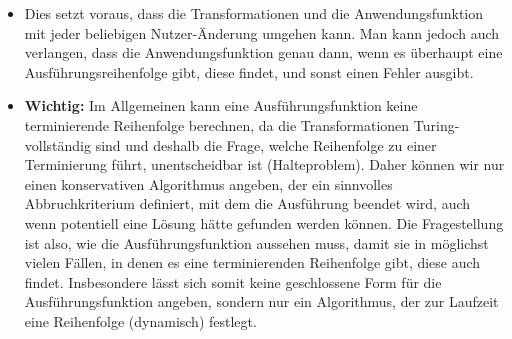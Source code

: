 \begin{itemize}
\begin{itemize}
    \end{itemize}
    \item Dies setzt voraus, dass die Transformationen und die Anwendungsfunktion mit jeder beliebigen Nutzer-Änderung umgehen kann. Man kann jedoch auch verlangen, dass die Anwendungsfunktion genau dann, wenn es überhaupt eine Ausführungsreihenfolge gibt, diese findet, und sonst einen Fehler ausgibt.
    \item \textbf{Wichtig:} Im Allgemeinen kann eine Ausführungsfunktion keine terminierende Reihenfolge berechnen, da die Transformationen Turing-vollständig sind und deshalb die Frage, welche Reihenfolge zu einer Terminierung führt, unentscheidbar ist (Halteproblem). Daher können wir nur einen konservativen Algorithmus angeben, der ein sinnvolles Abbruchkriterium definiert, mit dem die Ausführung beendet wird, auch wenn potentiell eine Lösung hätte gefunden werden können. Die Fragestellung ist also, wie die Ausführungsfunktion aussehen muss, damit sie in möglichst vielen Fällen, in denen es eine terminierenden Reihenfolge gibt, diese auch findet. Insbesondere lässt sich somit keine geschlossene Form für die Ausführungsfunktion angeben, sondern nur ein Algorithmus, der zur Laufzeit eine Reihenfolge (dynamisch) festlegt.
\end{itemize}


